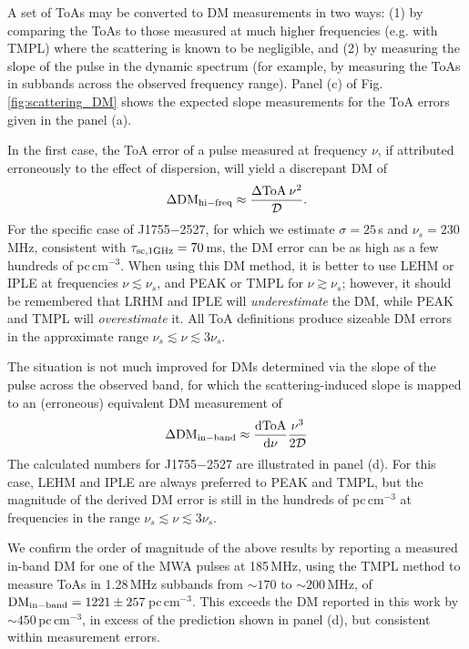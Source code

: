 \documentclass[fleqn,usenatbib]{mnras}
\newcommand{\src}{J1755$-$2527}
\newcommand{\deriv}[2]{\frac{{\rm d}{#1}}{{\rm d}{#2}}}
\newcommand{\ToA}[1]{{\rm ToA}_{\rm {#1}}}
\begin{document}
A set of ToAs may be converted to DM measurements in two ways: (1) by comparing the ToAs to those measured at much higher frequencies (e.g. with TMPL) where the scattering is known to be negligible, and (2) by measuring the slope of the pulse in the dynamic spectrum (for example, by measuring the ToAs in subbands across the observed frequency range).
Panel (c) of Fig. \ref{fig:scattering_DM} shows the expected slope measurements for the ToA errors given in the panel (a).

In the first case, the ToA error of a pulse measured at frequency $\nu$, if attributed erroneously to the effect of dispersion, will yield a discrepant DM of
\begin{equation}
    \Delta{\rm DM}_{\rm hi-freq} \approx \frac{\Delta\ToA{}\,\nu^2}{\mathcal{D}}.
\end{equation}
For the specific case of \src{}, for which we estimate $\sigma = 25\,$s and $\nu_s = 230\,$MHz, consistent with $\tau_{\rm sc,1 GHz} = 70\,$ms, the DM error can be as high as a few hundreds of pc\,cm$^{-3}$.
When using this DM method, it is better to use LEHM or IPLE at frequencies $\nu \lesssim \nu_s$, and PEAK or TMPL for $\nu \gtrsim \nu_s$; however, it should be remembered that LRHM and IPLE will \emph{underestimate} the DM, while PEAK and TMPL will \emph{overestimate} it.
All ToA definitions produce sizeable DM errors in the approximate range $\nu_s \lesssim \nu \lesssim 3\nu_s$.

The situation is not much improved for DMs determined via the slope of the pulse across the observed band, for which the scattering-induced slope is mapped to an (erroneous) equivalent DM measurement of
\begin{equation}
    \Delta{\rm DM}_{\rm in-band} \approx \deriv{{\rm ToA}}{\nu} \frac{\nu^3}{2\mathcal{D}}
\end{equation}
The calculated numbers for \src{} are illustrated in panel (d).
For this case, LEHM and IPLE are always preferred to PEAK and TMPL, but the magnitude of the derived DM error is still in the hundreds of pc\,cm$^{-3}$ at frequencies in the range $\nu_s \lesssim \nu \lesssim 3\nu_s$.

We confirm the order of magnitude of the above results by reporting a measured in-band DM for one of the MWA pulses at 185\,MHz, using the TMPL method to measure ToAs in 1.28\,MHz subbands from ${\sim}170$ to ${\sim}200\,$MHz, of ${\rm DM}_{\rm in-band} = 1221\pm257\,$pc\,cm$^{-3}$.
This exceeds the DM reported in this work by ${\sim}450\,$pc\,cm$^{-3}$, in excess of the prediction shown in panel (d), but consistent within measurement errors.


\bsp	%
\label{lastpage}
\end{document}
